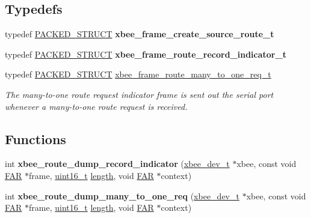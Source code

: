 \subsection*{Typedefs}
\begin{DoxyCompactItemize}
\item 
typedef \hyperlink{group___s_x_a_ga4233297bd31be5c273d4fb0758cc54d7}{P\-A\-C\-K\-E\-D\-\_\-\-S\-T\-R\-U\-C\-T} {\bfseries xbee\-\_\-frame\-\_\-create\-\_\-source\-\_\-route\-\_\-t}
\item 
typedef \hyperlink{group___s_x_a_ga4233297bd31be5c273d4fb0758cc54d7}{P\-A\-C\-K\-E\-D\-\_\-\-S\-T\-R\-U\-C\-T} {\bfseries xbee\-\_\-frame\-\_\-route\-\_\-record\-\_\-indicator\-\_\-t}
\item 
typedef \hyperlink{group___s_x_a_ga4233297bd31be5c273d4fb0758cc54d7}{P\-A\-C\-K\-E\-D\-\_\-\-S\-T\-R\-U\-C\-T} \hyperlink{group__xbee__route_gafc3f728061ea39f21f16bc8ac5d443bd}{xbee\-\_\-frame\-\_\-route\-\_\-many\-\_\-to\-\_\-one\-\_\-req\-\_\-t}
\begin{DoxyCompactList}\small\item\em The many-\/to-\/one route request indicator frame is sent out the serial port whenever a many-\/to-\/one route request is received. \end{DoxyCompactList}\end{DoxyCompactItemize}
\subsection*{Functions}
\begin{DoxyCompactItemize}
\item 
\hypertarget{group__xbee__route_ga8559adb8f9d26e32597bd6b5d23d4935}{int {\bfseries xbee\-\_\-route\-\_\-dump\-\_\-record\-\_\-indicator} (\hyperlink{structxbee__dev__t}{xbee\-\_\-dev\-\_\-t} $\ast$xbee, const void \hyperlink{group__hal_gaef060b3456fdcc093a7210a762d5f2ed}{F\-A\-R} $\ast$frame, \hyperlink{group__hal_ga5a8b2dc9e45a9ee81a94ef304fb62505}{uint16\-\_\-t} \hyperlink{group__zdo_gab2b3adeb2a67e656ff030b56727fd0ac}{length}, void \hyperlink{group__hal_gaef060b3456fdcc093a7210a762d5f2ed}{F\-A\-R} $\ast$context)}\label{group__xbee__route_ga8559adb8f9d26e32597bd6b5d23d4935}

\item 
\hypertarget{group__xbee__route_ga73e95bc53a68ff57892795a9b65a2e20}{int {\bfseries xbee\-\_\-route\-\_\-dump\-\_\-many\-\_\-to\-\_\-one\-\_\-req} (\hyperlink{structxbee__dev__t}{xbee\-\_\-dev\-\_\-t} $\ast$xbee, const void \hyperlink{group__hal_gaef060b3456fdcc093a7210a762d5f2ed}{F\-A\-R} $\ast$frame, \hyperlink{group__hal_ga5a8b2dc9e45a9ee81a94ef304fb62505}{uint16\-\_\-t} \hyperlink{group__zdo_gab2b3adeb2a67e656ff030b56727fd0ac}{length}, void \hyperlink{group__hal_gaef060b3456fdcc093a7210a762d5f2ed}{F\-A\-R} $\ast$context)}\label{group__xbee__route_ga73e95bc53a68ff57892795a9b65a2e20}

\end{DoxyCompactItemize}
